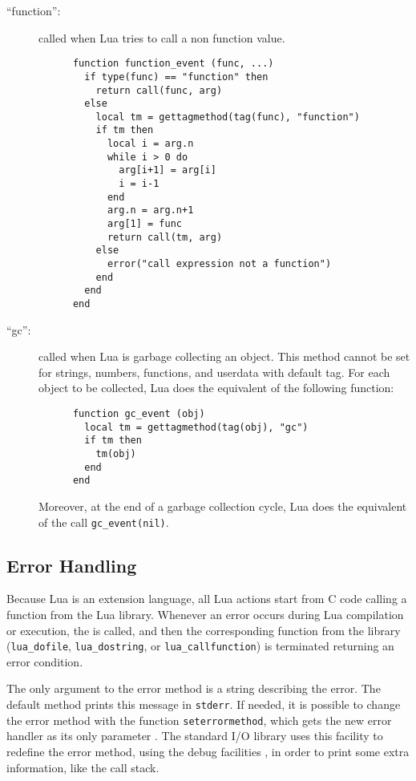 \begin{description}
\item[``function'':]
called when Lua tries to call a non function value.
\begin{verbatim}
      function function_event (func, ...)
        if type(func) == "function" then
          return call(func, arg)
        else
          local tm = gettagmethod(tag(func), "function")
          if tm then
            local i = arg.n
            while i > 0 do
              arg[i+1] = arg[i]
              i = i-1
            end
            arg.n = arg.n+1
            arg[1] = func
            return call(tm, arg)
          else
            error("call expression not a function")
          end
        end
      end
\end{verbatim}

\item[``gc'':]
called when Lua is garbage collecting an object.
This method cannot be set for strings, numbers, functions,
and userdata with default tag.
For each object to be collected,
Lua does the equivalent of the following function:
\begin{verbatim}
      function gc_event (obj)
        local tm = gettagmethod(tag(obj), "gc")
        if tm then
          tm(obj)
        end
      end
\end{verbatim}
Moreover, at the end of a garbage collection cycle,
Lua does the equivalent of the call \verb|gc_event(nil)|.

\end{description}



\subsection{Error Handling} \label{error}

Because Lua is an extension language,
all Lua actions start from C code calling a function from the Lua library.
Whenever an error occurs during Lua compilation or execution,
the  is called,
and then the corresponding function from the library
(\verb|lua_dofile|, \verb|lua_dostring|, or \verb|lua_callfunction|)
is terminated returning an error condition.

The only argument to the error method is a string
describing the error.
The default method prints this message in \verb|stderr|.
If needed, it is possible to change the error method with the
function \verb|seterrormethod|,
which gets the new error handler as its only parameter
.
The standard I/O library uses this facility to redefine the error method,
using the debug facilities ,
in order to print some extra information,
like the call stack.

